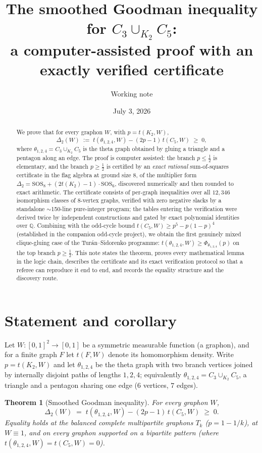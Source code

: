 \documentclass[11pt]{article}
\title{The smoothed Goodman inequality for $C_3\cup_{K_2}C_5$:\\
a computer-assisted proof with an exactly verified certificate}
\author{Working note}
\date{July 3, 2026}
\newtheorem{theorem}{Theorem}[section]
\theoremstyle{definition}
\newcommand{\Q}{\mathbb Q}
\newcommand{\thet}{\theta_{1,2,4}}
\begin{document}
\maketitle

\begin{abstract}
We prove that for every graphon $W$, with $p=t(K_2,W)$,
\[
  \Delta_2(W)\;:=\;t(\thet,W)-(2p-1)\,t(C_5,W)\;\ge\;0,
\]
where $\thet=C_3\cup_{K_2}C_5$ is the theta graph obtained by gluing a triangle
and a pentagon along an edge.  The proof is computer assisted: the branch
$p\le\tfrac12$ is elementary, and the branch $p\ge\tfrac12$ is certified by an
\emph{exact rational} sum-of-squares certificate in the flag algebra at ground
size $8$, of the multiplier form
$\Delta_2=\mathrm{SOS}_8+(2t(K_2)-1)\cdot\mathrm{SOS}_6$, discovered
numerically and then rounded to exact arithmetic.  The certificate consists of
per-graph inequalities over all $12{,}346$ isomorphism classes of $8$-vertex
graphs, verified with zero negative slacks by a standalone $\sim$150-line
pure-integer program; the tables entering the verification were derived twice
by independent constructions and gated by exact polynomial identities over
$\Q$.  Combining with the odd-cycle bound $t(C_5,W)\ge p^5-p(1-p)^4$
(established in the companion odd-cycle project), we obtain the first genuinely
mixed clique-gluing case of the Tur\'an--Sidorenko programme:
$t(\thet,W)\ge\Phi_{\thet}(p)$ on the top branch $p\ge\tfrac12$.
This note states the theorem, proves every mathematical lemma in the logic
chain, describes the certificate and its exact verification protocol so that a
referee can reproduce it end to end, and records the equality structure and
the discovery route.
\end{abstract}

\tableofcontents

\section{Statement and corollary}

Let $W:[0,1]^2\to[0,1]$ be a symmetric measurable function (a graphon), and for
a finite graph $F$ let $t(F,W)$ denote its homomorphism density.  Write
$p=t(K_2,W)$ and let $\thet$ be the theta graph with two branch vertices joined
by internally disjoint paths of lengths $1,2,4$; equivalently
$\thet=C_3\cup_{K_2}C_5$, a triangle and a pentagon sharing one edge ($6$
vertices, $7$ edges).

\begin{theorem}[Smoothed Goodman inequality]\label{thm:main}
For every graphon $W$,
\[
  \Delta_2(W)\;=\;t(\thet,W)-(2p-1)\,t(C_5,W)\;\ge\;0 .
\]
Equality holds at the balanced complete multipartite graphons $T_k$
\textup{(}$p=1-1/k$\textup{)}, at $W\equiv1$, and on every graphon supported on
a bipartite pattern \textup{(}where $t(\thet,W)=t(C_5,W)=0$\textup{)}.
\end{theorem}
\end{document}
